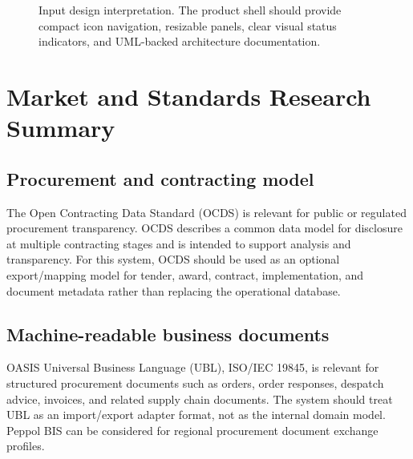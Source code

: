 \documentclass[11pt]{article}
\begin{document}
\begin{figure}[H]
\centering
{}
\caption{Input design interpretation. The product shell should provide compact icon navigation, resizable panels, clear visual status indicators, and UML-backed architecture documentation.}
\label{fig:inputrefs}
\end{figure}



\section{Market and Standards Research Summary}

\subsection{Procurement and contracting model}
The Open Contracting Data Standard (OCDS) is relevant for public or regulated procurement transparency. OCDS describes a common data model for disclosure at multiple contracting stages and is intended to support analysis and transparency. For this system, OCDS should be used as an optional export/mapping model for tender, award, contract, implementation, and document metadata rather than replacing the operational database.

\subsection{Machine-readable business documents}
OASIS Universal Business Language (UBL), ISO/IEC 19845, is relevant for structured procurement documents such as orders, order responses, despatch advice, invoices, and related supply chain documents. The system should treat UBL as an import/export adapter format, not as the internal domain model. Peppol BIS can be considered for regional procurement document exchange profiles.
\end{document}

